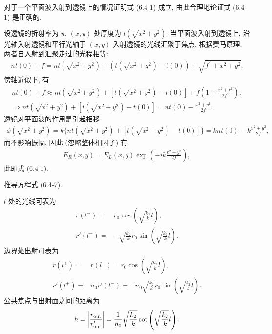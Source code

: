 \documentclass[twoside]{note}
\begin{document}
\begin{exe}
    对于一个平面波入射到透镜上的情况证明式 (6.4-1) 成立, 由此合理地论证式 (6.4-1) 是正确的.
\end{exe}
\begin{pf}
    设透镜的折射率为 $n$, $(x,y)$ 处厚度为 $t(\sqrt{x^2+y^2})$. 当平面波入射到透镜上, 沿光轴入射透镜和平行光轴于 $(x,y)$ 入射透镜的光线汇聚于焦点, 根据费马原理, 两者自入射到汇聚走过的光程相等:
    \begin{align}
        nt(0)+f=nt(\sqrt{x^2+y^2})+(t(\sqrt{x^2+y^2})-t(0))+\sqrt{f^2+x^2+y^2}.
    \end{align}
    傍轴近似下, 有
    \begin{gather}
        nt(0)+f\approx nt(\sqrt{x^2+y^2})+[t(\sqrt{x^2+y^2})-t(0)]+f\left(1+\frac{x^2+y^2}{2f^2}\right),\\
        \Longrightarrow nt(\sqrt{x^2+y^2})+[t(\sqrt{x^2+y^2})-t(0)]=nt(0)-\frac{x^2+y^2}{2f}.
    \end{gather}
    透镜对平面波的作用是引起相移
    \begin{align}
        \phi(\sqrt{x^2+y^2})=k\{nt(\sqrt{x^2+y^2})+[t(\sqrt{x^2+y^2})-t(0)]\}=knt(0)-k\frac{x^2+y^2}{2f},
    \end{align}
    而不影响振幅, 因此 (忽略整体相因子) 有
    \begin{align}
        E_R(x,y)=E_L(x,y)\exp\left(-ik\frac{x^2+y^2}{2f}\right),
    \end{align}
    此即式 (6.4-1).
\end{pf}

\begin{exe}
    推导方程式 (6.4-7).
\end{exe}
\begin{pf}
    $l$ 处的光线可表为
    \begin{align}
        r(l^-)=&r_0\cos\left(\sqrt{\frac{k_2}{k}}l\right),\\
        r'(l^-)=&-\sqrt{\frac{k_2}{k}}r_0\sin\left(\sqrt{\frac{k_2}{k}}l\right).
    \end{align}
    边界处出射可表为
    \begin{align}
        r(l^+)=&r(l^-)=r_0\cos\left(\sqrt{\frac{k_2}{k}}l\right),\\
        r'(l^+)=&n_0r'(l^-)=-n_0\sqrt{\frac{k_2}{k}}r_0\sin\left(\sqrt{\frac{k_2}{k}}l\right).
    \end{align}
    公共焦点与出射面之间的距离为
    \begin{gather}
        h=\left\lvert\frac{r_{\text{out}}}{r'_{\text{out}}}\right\rvert=\frac{1}{n_0}\sqrt{\frac{k_2}{k}}\cot\left(\sqrt{\frac{k_2}{k}}l\right).
    \end{gather}
\end{pf}
\end{document}

